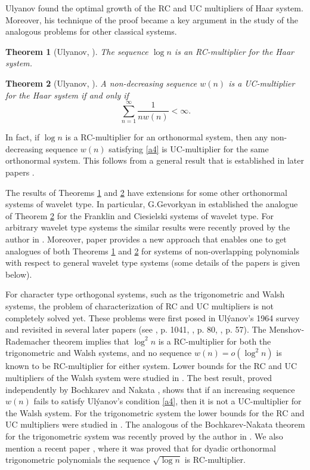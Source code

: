\documentclass[12pt,reqno,fleqn]{amsart}
\theoremstyle{plain} %
\newtheorem{OldTheorem}{Theorem}
\theoremstyle{remark}
\theoremstyle{plain}
\numberwithin{equation}{section}
\newcommand {\e }[1]{\eqref{#1}}
\begin{document}
Ul\cprime yanov \cite{Uly1, Uly4} found the optimal growth of the RC and UC multipliers of Haar system. Moreover, his  technique of the proof became a key argument in the study of the analogous problems for other classical systems.

\begin{OldTheorem}[Ul\cprime yanov, \cite{Uly4}]\label{OT1}
	The sequence $\log n$ is an RC-multiplier for the Haar system.
\end{OldTheorem}
\begin{OldTheorem}[Ul\cprime yanov, \cite{Uly4}]\label{OT2}
	A non-decreasing sequence $w(n)$ is a UC-multiplier for the Haar system if and only if
	\begin{equation}\label{a4}
		\sum_{n=1}^\infty\frac{1}{nw(n)}<\infty.
	\end{equation}
\end{OldTheorem}
In fact, if $\log n$ is a RC-multiplier for an orthonormal system, then any non-decreasing sequence $w(n)$ satisfying \e{a4} is UC-multiplier for the same orthonormal system. This follows from a general result that is established in later papers \cite{Uly3, Pol}.

The results of Theorems \ref{OT1} and \ref{OT2} have extensions for some other orthonormal systems of wavelet type. In particular,
G.Gevorkyan in \cite{Gev,Gev1} established the analogue of Theorem \ref{OT2} for the Franklin and Ciesielski systems of wavelet type. For arbitrary wavelet type systems the similar results were recently proved by the author in \cite{KaKa}. Moreover, paper \cite{KaKa} provides a new approach that enables one to get  analogues of both Theorems \ref{OT1} and \ref{OT2} for systems of non-overlapping polynomials with respect to general  wavelet type systems (some details of the papers is given below).




For character type orthogonal systems, such as the trigonometric and Walsh systems, the problem of characterization of RC and UC multipliers is not completely solved yet. These problems were first posed in Ul\'yanov’s 1964 survey \cite{Uly5} and revisited in several later papers (see \cite{Uly4}, p. 1041, \cite{Uly8}, p. 80, \cite{Uly9}, p. 57). The Menshov-Rademacher theorem implies that $\log^2 n$ is a RC-multiplier for both the trigonometric and Walsh systems, and no sequence $w(n)=o(\log^2n)$ is known to be RC-multiplier for either system. 
Lower bounds for the RC and UC multipliers of the Walsh system were studied in \cite{Boch, Nak5, Nak3, Tan3}. The best result, proved independently by Bochkarev \cite{Boch2, Boch} and Nakata \cite{Nak3}, shows that if an increasing sequence $w(n)$ fails to satisfy Ul\'yanov's condition \e{a4},
then it is not a UC-multiplier for the Walsh system. For the trigonometric system the lower bounds for the RC and UC multipliers were studied in \cite{Mor, Tan2, Nak1, Nak2, Seroj,Kar2,Kar3}. The analogous of the Bochkarev-Nakata \cite{Boch, Nak3} theorem for the trigonometric system was recently proved by the author in \cite{Kar2}. We also mention a recent paper \cite{Kar5}, where it was proved that for dyadic orthonormal trigonometric polynomials the sequence $\sqrt{\log n}$ is RC-multiplier.
\end{document}
